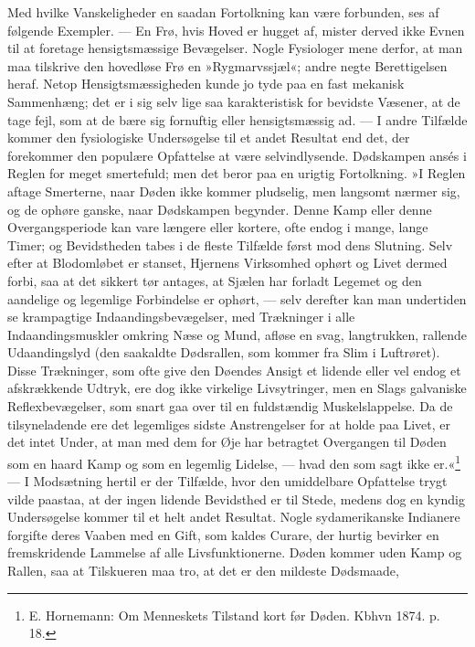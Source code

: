 \documentclass[12pt,a4paper,openany]{book}
\newcommand{\opage}[1]{\marginnote{\footnotesize\textit{[#1]}}}
\begin{document}
Med hvilke Vanskeligheder en saadan Fortolkning kan være forbunden, ses
af følgende Exempler. --- En Frø, hvis Hoved er hugget af, mister derved
ikke Evnen til at foretage hensigtsmæssige Bevægelser. Nogle Fysiologer
mene derfor, at man maa tilskrive den hovedløse Frø en »Rygmarvssjæl«;
andre negte Berettigelsen heraf. Netop Hensigtsmæssigheden
\opage{12}kunde jo tyde paa en fast mekanisk Sammenhæng; det er i sig
selv lige saa karakteristisk for bevidste Væsener, at de tage fejl, som
at de bære sig fornuftig eller hensigtsmæssig ad. --- I andre Tilfælde
kommer den fysiologiske Undersøgelse til et andet Resultat end det, der
forekommer den populære Opfattelse at være selvindlysende. Dødskampen
ansés i Reglen for meget smertefuld; men det beror paa en urigtig
Fortolkning. »I Reglen aftage Smerterne, naar Døden ikke kommer
pludselig, men langsomt nærmer sig, og de ophøre ganske, naar Dødskampen
begynder. Denne Kamp eller denne Overgangsperiode kan vare længere eller
kortere, ofte endog i mange, lange Timer; og Bevidstheden tabes i de
fleste Tilfælde først mod dens Slutning. Selv efter at Blodomløbet er
stanset, Hjernens Virksomhed ophørt og Livet dermed forbi, saa at det
sikkert tør antages, at Sjælen har forladt Legemet og den aandelige og
legemlige Forbindelse er ophørt, --- selv derefter kan man undertiden se
krampagtige Indaandingsbevægelser, med Trækninger i alle
Indaandingsmuskler omkring Næse og Mund, afløse en svag, langtrukken,
rallende Udaandingslyd (den saakaldte Dødsrallen, som kommer fra Slim i
Luftrøret). Disse Trækninger, som ofte give den Døendes Ansigt et
lidende eller vel endog et afskrækkende Udtryk, ere dog ikke virkelige
Livsytringer, men en Slags galvaniske Reflexbevægelser, som snart gaa
over til en fuldstændig Muskelslappelse. Da de tilsyneladende ere det
legemliges sidste Anstrengelser for at holde paa Livet, er det intet
Under, at man med dem for Øje har betragtet Overgangen til Døden som en
haard Kamp og som en legemlig Lidelse, --- hvad den som sagt ikke
er.«\footnote[1]{E. Hornemann: Om Menneskets Tilstand kort før Døden.
Kbhvn 1874. p. 18.} --- I Modsætning hertil er der Tilfælde, hvor den
umiddelbare Opfattelse trygt vilde paastaa, at der ingen lidende
Bevidsthed er til Stede, medens dog en kyndig Undersøgelse kommer til et
helt andet Resultat. Nogle sydamerikanske Indianere forgifte deres
Vaaben med en Gift, som kaldes Curare, der hurtig bevirker en
fremskridende Lammelse af alle Livsfunktionerne. Døden kommer uden Kamp
og Rallen, saa at Tilskueren maa tro, at det er den mildeste Dødsmaade,
\end{document}
